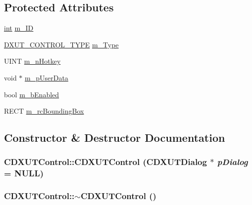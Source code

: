 \subsection*{Protected Attributes}
\begin{DoxyCompactItemize}
\item 
\hyperlink{_d_x_u_tgui_8cpp_a2d77ed03302b6978834ee3b6f57837fb}{int} \hyperlink{class_c_d_x_u_t_control_a4388cb300910f7f8feb339e05a8caace}{m\_\-ID}
\item 
\hyperlink{_d_x_u_tgui_8h_a5fa86fb50a57f4ecdc7723605c77d743}{DXUT\_\-CONTROL\_\-TYPE} \hyperlink{class_c_d_x_u_t_control_a7129785fc87a2609fe37f75510193945}{m\_\-Type}
\item 
UINT \hyperlink{class_c_d_x_u_t_control_a0acdf7fe9bc8465ec53ea1a90346cd9b}{m\_\-nHotkey}
\item 
void $\ast$ \hyperlink{class_c_d_x_u_t_control_a433792bb8edbdbb3c3ea2e8bf94601cb}{m\_\-pUserData}
\item 
bool \hyperlink{class_c_d_x_u_t_control_ae05508ff37757e6fcc59288f4ee08a13}{m\_\-bEnabled}
\item 
RECT \hyperlink{class_c_d_x_u_t_control_a79a42b50b16258d25085b298d0033800}{m\_\-rcBoundingBox}
\end{DoxyCompactItemize}


\subsection{Constructor \& Destructor Documentation}
\hypertarget{class_c_d_x_u_t_control_abbc50ddb4a91fe52f122787637efc715}{
\subsubsection[{CDXUTControl}]{\setlength{\rightskip}{0pt plus 5cm}CDXUTControl::CDXUTControl ({\bf CDXUTDialog} $\ast$ {\em pDialog} = {\ttfamily NULL})}}
\label{class_c_d_x_u_t_control_abbc50ddb4a91fe52f122787637efc715}
\hypertarget{class_c_d_x_u_t_control_a6277d18331e2a28fdc6aa9b588de8857}{
\subsubsection[{$\sim$CDXUTControl}]{\setlength{\rightskip}{0pt plus 5cm}CDXUTControl::$\sim$CDXUTControl ()}}
\label{class_c_d_x_u_t_control_a6277d18331e2a28fdc6aa9b588de8857}


